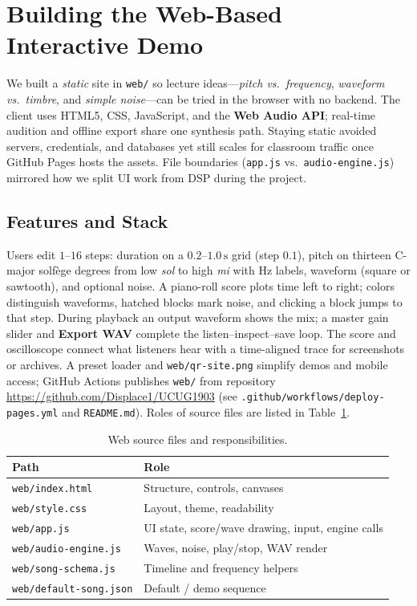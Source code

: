 \section{Building the Web-Based Interactive Demo}
\label{sec:web}

We built a \emph{static} site in \texttt{web/} so lecture ideas---\emph{pitch vs.\ frequency}, \emph{waveform vs.\ timbre}, and \emph{simple noise}---can be tried in the browser with no backend.
The client uses HTML5, CSS, JavaScript, and the \textbf{Web Audio API}; real-time audition and offline export share one synthesis path.
Staying static avoided servers, credentials, and databases yet still scales for classroom traffic once GitHub Pages hosts the assets.
File boundaries (\texttt{app.js} vs.\ \texttt{audio-engine.js}) mirrored how we split UI work from DSP during the project.

\subsection{Features and Stack}

Users edit $1$--$16$ steps: duration on a $0.2$--$1.0\,\mathrm{s}$ grid (step $0.1$), pitch on thirteen C-major solf\`{e}ge degrees from low \textit{sol} to high \textit{mi} with Hz labels, waveform (square or sawtooth), and optional noise.
A piano-roll score plots time left to right; colors distinguish waveforms, hatched blocks mark noise, and clicking a block jumps to that step.
During playback an output waveform shows the mix; a master gain slider and \textbf{Export WAV} complete the listen--inspect--save loop.
The score and oscilloscope connect what listeners hear with a time-aligned trace for screenshots or archives.
A preset loader and \texttt{web/qr-site.png} simplify demos and mobile access; GitHub Actions publishes \texttt{web/} from repository \url{https://github.com/Displace1/UCUG1903} (see \texttt{.github/workflows/deploy-pages.yml} and \texttt{README.md}).
Roles of source files are listed in Table~\ref{tab:web-files}.

\begin{table}[htbp]
  \centering
  \caption{Web source files and responsibilities.}
  \label{tab:web-files}
  \begin{tabular}{@{}ll@{}}
    \toprule
    Path & Role \\
    \midrule
    \texttt{web/index.html} & Structure, controls, canvases \\
    \texttt{web/style.css} & Layout, theme, readability \\
    \texttt{web/app.js} & UI state, score/wave drawing, input, engine calls \\
    \texttt{web/audio-engine.js} & Waves, noise, play/stop, WAV render \\
    \texttt{web/song-schema.js} & Timeline and frequency helpers \\
    \texttt{web/default-song.json} & Default / demo sequence \\
    \bottomrule
  \end{tabular}
\end{table}

